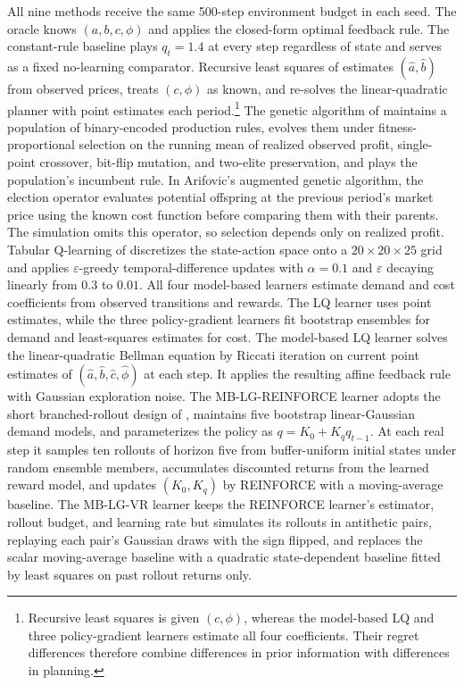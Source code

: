 All nine methods receive the same 500-step environment budget in each seed.
The oracle knows $(a, b, c, \phi)$ and applies the closed-form optimal feedback rule.
The constant-rule baseline plays $q_t = 1.4$ at every step regardless of state and serves as a fixed no-learning comparator.
Recursive least squares of \citet{MarcetSargent1989} estimates $(\hat a, \hat b)$ from observed prices, treats $(c, \phi)$ as known, and re-solves the linear-quadratic planner with point estimates each period.\footnote{Recursive least squares is given $(c, \phi)$, whereas the model-based LQ and three policy-gradient learners estimate all four coefficients. Their regret differences therefore combine differences in prior information with differences in planning.}
The genetic algorithm of \citet{Arifovic1994} maintains a population of binary-encoded production rules, evolves them under fitness-proportional selection on the running mean of realized observed profit, single-point crossover, bit-flip mutation, and two-elite preservation, and plays the population's incumbent rule.
In Arifovic's augmented genetic algorithm, the election operator evaluates potential offspring at the previous period's market price using the known cost function before comparing them with their parents. The simulation omits this operator, so selection depends only on realized profit.
Tabular Q-learning of \citet{WatkinsDayan1992} discretizes the state-action space onto a $20 \times 20 \times 25$ grid and applies $\varepsilon$-greedy temporal-difference updates with $\alpha = 0.1$ and $\varepsilon$ decaying linearly from $0.3$ to $0.01$.
All four model-based learners estimate demand and cost coefficients from observed transitions and rewards. The LQ learner uses point estimates, while the three policy-gradient learners fit bootstrap ensembles for demand and least-squares estimates for cost.
The model-based LQ learner solves the linear-quadratic Bellman equation by Riccati iteration on current point estimates of $(\hat a, \hat b, \hat c, \hat \phi)$ at each step. It applies the resulting affine feedback rule with Gaussian exploration noise.
The MB-LG-REINFORCE learner adopts the short branched-rollout design of \citet{janner2019model}, maintains five bootstrap linear-Gaussian demand models, and parameterizes the policy as $q = K_0 + K_q q_{t-1}$.
At each real step it samples ten rollouts of horizon five from buffer-uniform initial states under random ensemble members, accumulates discounted returns from the learned reward model, and updates $(K_0, K_q)$ by REINFORCE with a moving-average baseline.
The MB-LG-VR learner keeps the REINFORCE learner's estimator, rollout budget, and learning rate but simulates its rollouts in antithetic pairs, replaying each pair's Gaussian draws with the sign flipped, and replaces the scalar moving-average baseline with a quadratic state-dependent baseline fitted by least squares on past rollout returns only.
